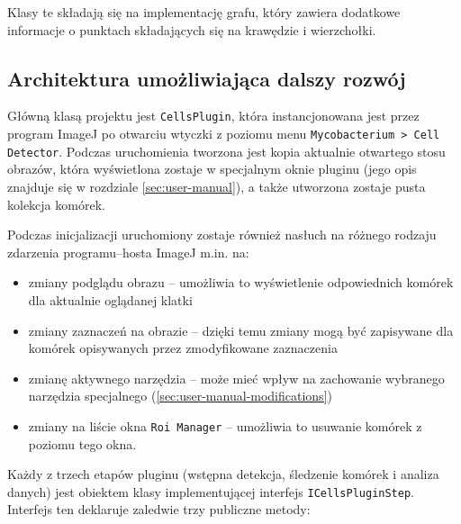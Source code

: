 \documentclass[declaration,shortabstract,mgr]{iithesis}
\begin{document}
Klasy te składają się na implementację grafu, który zawiera dodatkowe informacje o punktach składających się na krawędzie i wierzchołki.

\subsection{Architektura umożliwiająca dalszy rozwój}
\label{sec:architecture}

Główną klasą projektu jest \texttt{CellsPlugin}, która instancjonowana jest przez program ImageJ po otwarciu wtyczki z poziomu menu \texttt{Mycobacterium > Cell Detector}.
Podczas uruchomienia tworzona jest kopia aktualnie otwartego stosu obrazów, która wyświetlona zostaje w specjalnym oknie pluginu (jego opis znajduje się w rozdziale \ref{sec:user-manual}), a także utworzona zostaje pusta kolekcja komórek.

Podczas inicjalizacji uruchomiony zostaje również nasłuch na różnego rodzaju zdarzenia programu--hosta ImageJ m.in. na:
\begin{itemize}
  \item zmiany podglądu obrazu -- umożliwia to wyświetlenie odpowiednich komórek dla aktualnie oglądanej klatki
  \item zmiany zaznaczeń na obrazie -- dzięki temu zmiany mogą być zapisywane dla komórek opisywanych przez zmodyfikowane zaznaczenia
  \item zmianę aktywnego narzędzia -- może mieć wpływ na zachowanie wybranego narzędzia specjalnego (\ref{sec:user-manual-modifications})
  \item zmiany na liście okna \texttt{Roi Manager} -- umożliwia to usuwanie komórek z poziomu tego okna.
\end{itemize}

Każdy z trzech etapów pluginu (wstępna detekcja, śledzenie komórek i analiza danych) jest obiektem klasy implementującej interfejs \texttt{ICellsPluginStep}.
Interfejs ten deklaruje zaledwie trzy publiczne metody:
\end{document}
